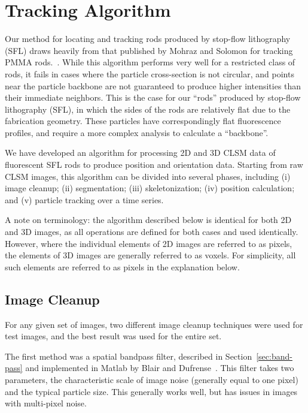 \section{Tracking Algorithm}
\label{sec:rod-tracking}

Our method for locating and tracking rods produced by stop-flow lithography (SFL) draws heavily from that published by 
Mohraz and Solomon for tracking PMMA rods.~\cite{rods-mohraz}.
While this algorithm performs very well for a restricted class of rods, it fails in cases where the particle
cross-section is not circular, and points near the particle backbone are not guaranteed to produce higher 
intensities than their immediate neighbors.  This is the case for our ``rods'' produced by stop-flow
lithography (SFL), in which the sides of the rods are relatively flat due to the fabrication
geometry. These particles have correspondingly flat fluorescence profiles, and require a more complex analysis
to calculate a ``backbone''.

We have developed an algorithm for processing 2D and 3D CLSM data of fluorescent SFL rods to
produce position and orientation data.  Starting from raw CLSM images, this algorithm can be divided
into several phases, including (i) image cleanup; (ii) segmentation; (iii) skeletonization;
(iv) position calculation; and
(v) particle tracking over a time series.  

A note on terminology: the algorithm described below is identical for both 2D and 3D images, as all
operations are defined for both cases and used identically. However, where the individual elements of
2D images are referred to as pixels, the elements of 3D images are generally referred to as voxels.
For simplicity, all such elements are referred to as pixels in the explanation below.

\subsection{Image Cleanup}

For any given set of images, two different image cleanup techniques were used for test
images, and the best result was used for the entire set.

The first method was a spatial bandpass filter, described in 
Section~\ref{sec:band-pass} and implemented in Matlab by Blair and
Dufrense~\cite{blair-dufrense-matlab}. This filter takes two parameters, the characteristic scale
of image noise (generally equal to one pixel) and the typical particle size.  This 
generally works well,
but has issues in images with multi-pixel noise.

